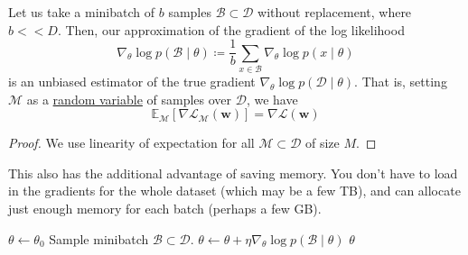   \begin{theorem}
    \label{thm:minibatch-gradient-is-an-unbiased-estimator}
    Let us take a minibatch of $b$ samples $\mathcal{B} \subset \mathcal{D}$ without replacement, where $b << D$. Then, our approximation of the gradient of the log likelihood
    \begin{equation}
       \nabla_\theta \log{p (\mathcal{B} \mid \theta)} \coloneqq \frac{1}{b} \sum_{x \in \mathcal{B}} \nabla_\theta \log{p(x \mid \theta)}
    \end{equation}
    is an unbiased estimator of the true gradient $\nabla_\theta \log{p(\mathcal{D} \mid \theta)}$. That is, setting $\mathcal{M}$ as a \hyperref[prob-def:random-variable]{random variable} of samples over $\mathcal{D}$, we have 
    \begin{equation}
      \mathbb{E}_{\mathcal{M}} [\nabla \mathcal{L}_{\mathcal{M}} (\mathbf{w})] = \nabla \mathcal{L} (\mathbf{w})
    \end{equation}
  \end{theorem}
  \begin{proof}
    We use linearity of expectation for all $\mathcal{M} \subset \mathcal{D}$ of size $M$. 
  \end{proof} 

  This also has the additional advantage of saving memory. You don't have to load in the gradients for the whole dataset (which may be a few TB), and can allocate just enough memory for each batch (perhaps a few GB). 

  \begin{algo}
    \begin{algorithm}[H]
    \label{alg:stochacistic-gradient-descent}
    \begin{algorithmic}[1]  %
        \State $\theta \gets \theta_0$ 
          \State Sample minibatch $\mathcal{B} \subset \mathcal{D}$. 
          \State $\theta \gets \theta + \eta \nabla_\theta \log p(\mathcal{B} \mid \theta)$ 
        \EndWhile
        \State \Return $\theta$
      \EndProcedure
    \end{algorithmic}
    \end{algorithm} 
  \end{algo} 

